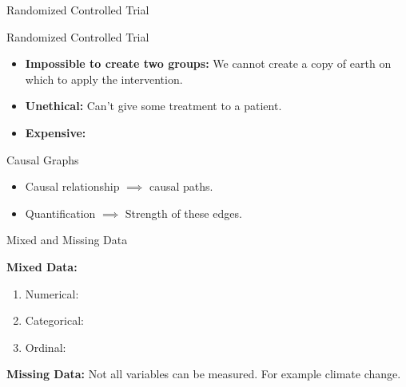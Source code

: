 \documentclass[aspectratio=169]{beamer}
\begin{document}
\begin{frame}{Randomized Controlled Trial}	
\end{frame}

\begin{frame}{Randomized Controlled Trial}
	
	\vspace{2em}

	\begin{itemize}[<+->]
		\item \textbf{Impossible to create two groups: } We cannot create a copy of earth on which to apply the intervention.
		\item \textbf{Unethical: } Can't give some treatment to a patient.
		\item \textbf{Expensive: }
	\end{itemize}

	\vspace{2em}

\end{frame}

\begin{frame}{Causal Graphs}


	\begin{itemize}
		\item Causal relationship $ \implies $ causal paths.
		\item Quantification $ \implies $ Strength of these edges.
	\end{itemize}
\end{frame}

\begin{frame}{Mixed and Missing Data}

	\textbf{Mixed Data:}
		\begin{enumerate}
			\item Numerical:
			\item Categorical:
			\item Ordinal:
		\end{enumerate}

	\textbf{Missing Data:} Not all variables can be measured. For example climate change.
\end{frame}
\end{document}

